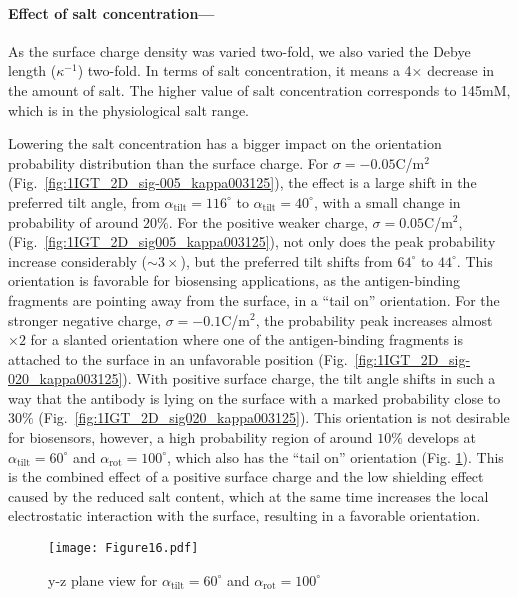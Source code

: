  \medskip
 
 \paragraph*{Effect of salt concentration---}
 
As the surface charge density was varied two-fold, we also varied the Debye length ($\kappa^{-1}$) two-fold. In terms of salt concentration, it means a 4$\times$ decrease in the amount of salt. The higher value of salt concentration corresponds to 145mM, which is in the physiological salt range.  
 
 Lowering the salt concentration has a bigger impact on the orientation probability distribution than the surface charge. 
 For $\sigma=-0.05$C/m$^2$ (Fig.~\ref{fig:1IGT_2D_sig-005_kappa003125}), the effect is a large shift in the preferred tilt angle, from $\alpha_\text{tilt}=116^\circ$ to $\alpha_\text{tilt}=40^\circ$, with a small change in probability of around $20\%$. 
For the positive weaker charge, $\sigma=0.05$C/m$^2$, (Fig.~\ref{fig:1IGT_2D_sig005_kappa003125}), not only does the peak probability increase considerably ($\sim 3\times$), but the preferred tilt shifts from $64^{\circ}$ to $44^{\circ}$.
This orientation is favorable for biosensing applications, as the antigen-binding fragments are pointing away from the surface, in a ``tail on'' orientation.
 For the stronger negative charge, $\sigma=-0.1$C/m$^2$, the probability peak increases almost $\times 2$ for a slanted orientation where one of the antigen-binding fragments is attached to the surface in an unfavorable position (Fig.~\ref{fig:1IGT_2D_sig-020_kappa003125}).
 With positive surface charge, the tilt angle shifts in such a way that the antibody is lying on the surface with a marked probability close to $30\%$ (Fig.~\ref{fig:1IGT_2D_sig020_kappa003125}).
 This orientation is not desirable for biosensors, however, a high probability region of around $10\%$ develops at $\alpha_\text{tilt}=60^\circ$ and $\alpha_\text{rot}=100^\circ$, which also has the ``tail on'' orientation (Fig. \ref{fig:second_preferred}).
This is the combined effect of a positive surface charge and the low shielding effect caused by the reduced salt content, which at the same time increases the local electrostatic interaction with the surface, resulting in a favorable orientation.

\begin{figure}[h] %
   \centering
   \texttt{[image: Figure16.pdf]} 
   \caption{y-z plane view for $\alpha_\text{tilt}=60^\circ$ and $\alpha_\text{rot}=100^\circ$}
   \label{fig:second_preferred}
\end{figure}

